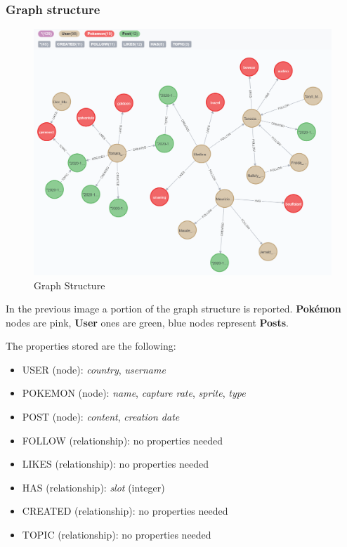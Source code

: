 \subsubsection{Graph structure}
\begin{figure}[H]
	\centering
	\includegraphics[width=\textwidth]{img/graph_structure2.png}
	\caption{Graph Structure}
\end{figure}

In the previous image a portion of the graph structure is reported. 
\textbf{Pokémon} nodes are pink, \textbf{User} ones are green, blue nodes represent \textbf{Posts}.

The properties stored are the following:
\begin{itemize}
	\item USER (node): \textit{country}, \textit{username}
	\item POKEMON (node): \textit{name}, \textit{capture rate},  \textit{sprite}, \textit{type}
	\item POST (node): \textit{content}, \textit{creation date}
	\item FOLLOW (relationship): no properties needed
	\item LIKES (relationship): no properties needed
	\item HAS (relationship): \textit{slot} (integer)
	\item CREATED (relationship): no properties needed
	\item TOPIC (relationship): no properties needed
\end{itemize}


